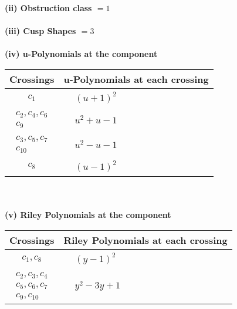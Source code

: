\documentclass[1p]{elsarticle_modified}
\theoremstyle{definition}
\begin{document}
\flushleft \textbf{(ii) Obstruction class $= 1$}\\~\\
\flushleft \textbf{(iii) Cusp Shapes $= 3$}\\~\\
\newpage\renewcommand{\arraystretch}{1}
\flushleft \textbf{(iv) u-Polynomials at the component}\newline \\
\begin{tabular}{m{50pt}|m{274pt}}
Crossings & \hspace{64pt}u-Polynomials at each crossing \\
\hline $$\begin{aligned}c_{1}\end{aligned}$$&$\begin{aligned}
&(u+1)^2
\end{aligned}$\\
\hline $$\begin{aligned}c_{2},c_{4},c_{6}\\c_{9}\end{aligned}$$&$\begin{aligned}
&u^2+u-1
\end{aligned}$\\
\hline $$\begin{aligned}c_{3},c_{5},c_{7}\\c_{10}\end{aligned}$$&$\begin{aligned}
&u^2- u-1
\end{aligned}$\\
\hline $$\begin{aligned}c_{8}\end{aligned}$$&$\begin{aligned}
&(u-1)^2
\end{aligned}$\\
\hline
\end{tabular}\\~\\
\newpage\renewcommand{\arraystretch}{1}
\flushleft \textbf{(v) Riley Polynomials at the component}\newline \\
\begin{tabular}{m{50pt}|m{274pt}}
Crossings & \hspace{64pt}Riley Polynomials at each crossing \\
\hline $$\begin{aligned}c_{1},c_{8}\end{aligned}$$&$\begin{aligned}
&(y-1)^2
\end{aligned}$\\
\hline $$\begin{aligned}c_{2},c_{3},c_{4}\\c_{5},c_{6},c_{7}\\c_{9},c_{10}\end{aligned}$$&$\begin{aligned}
&y^2-3 y+1
\end{aligned}$\\
\hline
\end{tabular}\\~\\
\end{document}
